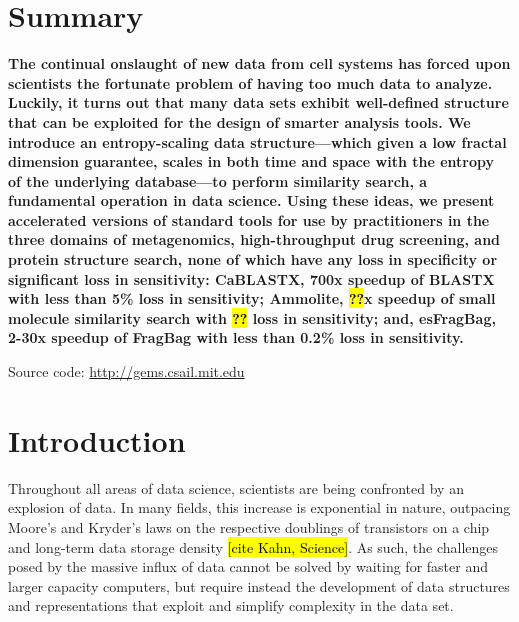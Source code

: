 \documentclass[review,preprint,12pt]{elsarticle}
\theoremstyle{definition}
\theoremstyle{remark}
\numberwithin{equation}{section}
\begin{document}
\section{Summary}
{ \bfseries
    The continual onslaught of new data from cell systems has forced upon scientists the fortunate problem of having too much data to analyze.
    Luckily, it turns out that many data sets exhibit well-defined structure that can be exploited for the design of 
smarter analysis tools.
    We introduce an entropy-scaling data structure---which given a low fractal dimension guarantee, scales in both time and space with the entropy of the underlying database---to perform similarity search, a fundamental operation in data science.
    Using these ideas, we present accelerated versions of standard tools for use by practitioners in the three domains of metagenomics, high-throughput drug screening, and protein structure search, none of which have any loss in specificity or significant loss in sensitivity:
    CaBLASTX, 700x speedup of BLASTX with less than 5\% loss in sensitivity; Ammolite, \hl{??}x speedup of small molecule similarity search with \hl{??} loss in sensitivity; and, esFragBag, 2-30x speedup of FragBag with less than 0.2\% loss in sensitivity.

    Source code: \url{http://gems.csail.mit.edu}
}

\section{Introduction}
Throughout all areas of data science, scientists are being confronted by an 
explosion of data.
In many fields, this increase is exponential in nature, outpacing Moore's and Kryder's laws on the respective doublings of transistors on a chip and long-term data storage density \hl{[cite Kahn, Science]}.
As such, the challenges posed by the massive influx of data cannot be solved by waiting for faster and larger capacity computers, but require instead the development of data structures and representations that exploit and simplify complexity in the data set.
\end{document}

